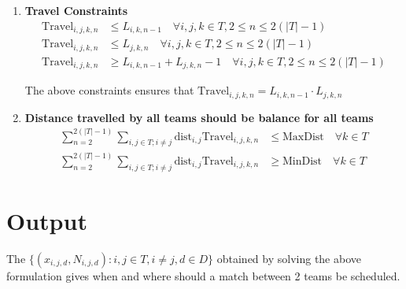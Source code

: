 \documentclass[a4paper, 12pt]{article}
\begin{document}
\begin{enumerate}
    \item \textbf{Travel Constraints}
    \begin{align*}
        \text{Travel}_{i,j,k,n} &\leq L_{i,k,n-1} \quad \forall i,j,k \in T ,2 \leq n \leq 2(|T| - 1)\\
        \text{Travel}_{i,j,k,n} &\leq L_{j,k,n} \quad \forall i,j,k \in T ,2 \leq n \leq 2(|T| - 1)\\
        \text{Travel}_{i,j,k,n} &\geq L_{i,k,n-1} + L_{j,k,n} - 1 \quad \forall i,j,k \in T ,2 \leq n \leq 2(|T| - 1)
    \end{align*}

    The above constraints ensures that $\text{Travel}_{i,j,k,n} = L_{i,k,n-1}\cdot L_{j,k,n}$

    \item \textbf{Distance travelled by all teams should be balance for all teams}
    \begin{align*}
        \sum_{n = 2}^{2(|T| - 1)}\sum_{i,j \in T; i \neq j} \text{dist}_{i,j} \text{Travel}_{i,j,k,n} &\leq \text{MaxDist} \quad \forall k \in T \\
        \sum_{n = 2}^{2(|T|-1)}\sum_{i,j \in T; i \neq j} \text{dist}_{i,j} \text{Travel}_{i,j,k,n} &\geq \text{MinDist} \quad \forall k \in T
    \end{align*}

\end{enumerate}

\section*{Output}
The $\{(x_{i,j,d},N_{i,j,d}): i,j \in T, i \neq j, d \in D\}$ obtained by solving the above formulation gives when and where should a match between 2 teams be scheduled.
\end{document}
